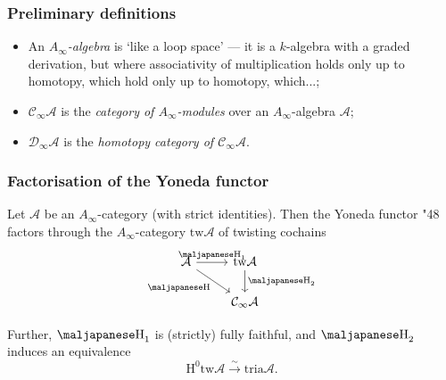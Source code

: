 \documentclass{beamer}
\begin{document}
        \begin{frame}\frametitle{Preliminary definitions}
            \begin{definition}
                \begin{itemize}
                    \item An \emph{$A_\infty$-algebra} is `like a loop space' --- it is a $k$-algebra with a graded derivation, but where associativity of multiplication holds only up to homotopy, which hold only up to homotopy, which...;
                    \item $\mathcal{C}_\infty\mathcal{A}$ is the \emph{category of $A_\infty$-modules} over an $A_\infty$-algebra $\mathcal{A}$;
                    \item $\mathcal{D}_\infty\mathcal{A}$ is the \emph{homotopy category of $\mathcal{C}_\infty\mathcal{A}$}.
                \end{itemize}
            \end{definition}
        \end{frame}

        \begin{frame}[fragile]\frametitle{Factorisation of the Yoneda functor}
            \begin{theorem}
                Let $\mathcal{A}$ be an $A_\infty$-category (with strict identities).
                Then the Yoneda functor {\maljapanese\char"48} factors through the $A_\infty$-category $\mathrm{tw}\mathcal{A}$ of twisting cochains
                \begin{equation*}
                    \begin{tikzcd}
                        \mathcal{A}
                            \ar[r,"\text{{\maljapanese\char"48}}_1"]
                            \ar[dr,swap,"\text{{\maljapanese\char"48}}"]
                        & \mathrm{tw}\mathcal{A}
                            \ar[d,"\text{{\maljapanese\char"48}}_2"]\\
                        & \mathcal{C}_\infty\mathcal{A}
                    \end{tikzcd}
                \end{equation*}

                \pause
                
                Further, $\text{{\maljapanese\char"48}}_1$ is (strictly) fully faithful, and $\text{{\maljapanese\char"48}}_2$ induces an equivalence
                \begin{equation*}
                    \mathrm{H}^0\mathrm{tw}\mathcal{A} \xrightarrow{\sim} \mathrm{tria}\mathcal{A}.
                \end{equation*}
            \end{theorem}
        \end{frame}
    
\end{document}
